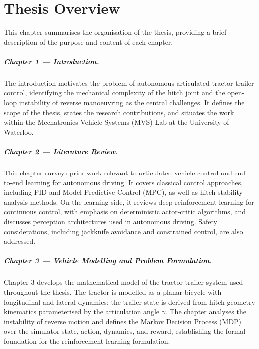 \chapter*{Thesis Overview}
\label{ch:overview}

This chapter summarises the organisation of the thesis, providing a brief description of the purpose and content of each chapter.

\paragraph{Chapter 1 — Introduction.}
The introduction motivates the problem of autonomous articulated tractor-trailer control, identifying the mechanical complexity of the hitch joint and the open-loop instability of reverse manoeuvring as the central challenges. It defines the scope of the thesis, states the research contributions, and situates the work within the Mechatronics Vehicle Systems (MVS) Lab at the University of Waterloo.

\paragraph{Chapter 2 — Literature Review.}
This chapter surveys prior work relevant to articulated vehicle control and end-to-end learning for autonomous driving. It covers classical control approaches, including PID and Model Predictive Control (MPC), as well as hitch-stability analysis methods. On the learning side, it reviews deep reinforcement learning for continuous control, with emphasis on deterministic actor-critic algorithms, and discusses perception architectures used in autonomous driving. Safety considerations, including jackknife avoidance and constrained control, are also addressed.

\paragraph{Chapter 3 — Vehicle Modelling and Problem Formulation.}
Chapter 3 develops the mathematical model of the tractor-trailer system used throughout the thesis. The tractor is modelled as a planar bicycle with longitudinal and lateral dynamics; the trailer state is derived from hitch-geometry kinematics parameterised by the articulation angle $\gamma$. The chapter analyses the instability of reverse motion and defines the Markov Decision Process (MDP) over the simulator state, action, dynamics, and reward, establishing the formal foundation for the reinforcement learning formulation.

